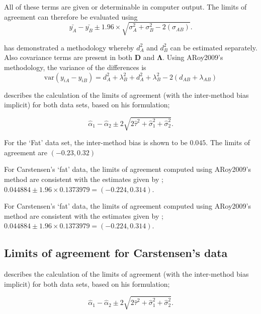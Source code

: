 \documentclass[12pt, a4paper]{report}
\theoremstyle{plain}
\theoremstyle{definition}
\theoremstyle{remark}
\begin{document}
	All of these terms are given or determinable in computer output. The limits of agreement can therefore be evaluated using
	\begin{equation}
	\bar{y_{A}}-\bar{y_{B}} \pm 1.96 \times \sqrt{ \sigma^2_{A} + \sigma^2_{B}  - 2(\sigma_{AB})}.
	\end{equation}
	
	
	
	\citet{ARoy2009} has demonstrated a methodology whereby $d^2_{A}$ and $d^2_{B}$ can be estimated separately. Also covariance terms are present in both $\boldsymbol{D}$ and $\boldsymbol{\Lambda}$. Using ARoy2009's methodology, the variance of the differences is
	\begin{equation}
	\mbox{var} (y_{iA}-y_{iB})= d^2_{A} + \lambda^2_{B} + d^2_{A} + \lambda^2_{B} - 2(d_{AB} + \lambda_{AB})
	\end{equation}
	
	
	
	
	\citet{BXC2008} describes the calculation of the limits of agreement (with the inter-method bias implicit) for both data sets, based on his formulation;
	
	\[\hat{\alpha}_1 - \hat{\alpha}_2 \pm 2\sqrt{2\hat{\tau}^2 +\hat{\sigma}_1^2 +\hat{\sigma}_2^2 }.\]
	
	
	For the `Fat' data set, the inter-method bias is shown to be $0.045$. The limits of agreement are $(-0.23 , 0.32)$
	
	For Carstensen's `fat' data, the limits of agreement computed using ARoy2009's
	method are consistent with the estimates given by \citet{BXC2008}; $0.044884  \pm 1.96 \times  0.1373979 = (-0.224,  0.314).$
	
	
	
	For Carstensen's `fat' data, the limits of agreement computed using ARoy2009's
	method are consistent with the estimates given by \citet{BXC2008}; $0.044884  \pm 1.96 \times  0.1373979 = (-0.224,  0.314).$
	
	
	
	
	\subsection{Limits of agreement for Carstensen's data}
	
	
	\citet{BXC2008} describes the calculation of the limits of agreement (with the inter-method bias implicit) for both data sets, based on his formulation;
	
	\[\hat{\alpha}_1 - \hat{\alpha}_2 \pm 2\sqrt{2\hat{\tau}^2 +\hat{\sigma}_1^2 +\hat{\sigma}_2^2 }.\]
	
\end{document}
